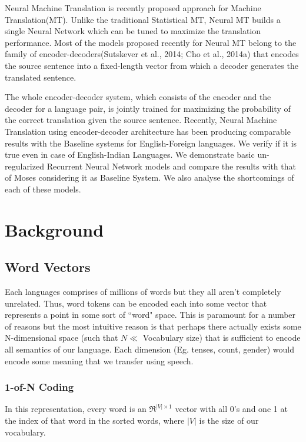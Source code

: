 \documentclass[12pt]{report}
\begin{document}
Neural Machine Translation is recently proposed approach for Machine Translation(MT). Unlike the traditional Statistical MT, Neural MT builds a single Neural Network which can be tuned to maximize the translation performance. Most of the models proposed recently for Neural MT belong to the family of encoder-decoders(Sutskever et al., 2014; Cho et al., 2014a) that encodes the source sentence into a fixed-length vector from which a decoder generates the translated sentence.

The whole encoder-decoder system, which consists of the encoder and the decoder for a language pair, is jointly trained for maximizing the probability of the correct translation given the source sentence. Recently, Neural Machine Translation using encoder-decoder architecture has been producing comparable results with the Baseline systems for English-Foreign languages. We verify if it is true even in case of English-Indian Languages. We demonstrate basic un-regularized Recurrent Neural Network models and compare the results with that of Moses considering it as Baseline System. We also analyse the shortcomings of each of these models.

\chapter{Background}

\section{Word Vectors}

Each languages comprises of millions of words but they all aren't completely unrelated. Thus, word tokens can be encoded each into some vector that represents a point in some sort of ``word" space. This is
paramount for a number of reasons but the most intuitive reason is
that perhaps there actually exists some N-dimensional space (such
that $N \ll $ Vocabulary size) that is sufficient to encode all semantics of
our language. Each dimension (Eg. tenses, count, gender) would encode some meaning that we transfer using speech.

\subsection{1-of-N Coding}
In this representation, every word is an $ \Re ^{|V| \times 1}$ vector with all 0's and one 1 at the index of that word in the sorted words, where $|V|$ is the size of our vocabulary.
\end{document}
